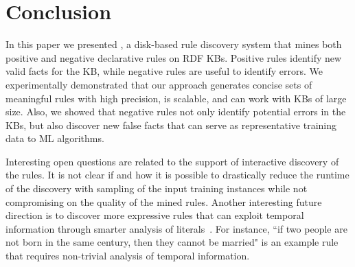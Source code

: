 \section{Conclusion}

In this paper we presented \krd, a disk-based rule discovery system that mines both positive and negative declarative rules on RDF KBs. Positive rules identify new valid facts for the KB, while negative rules are useful to identify errors. 
We experimentally demonstrated that our approach generates concise sets of meaningful rules with high precision,
is scalable, and can work with KBs of large size. 
Also, we showed that negative rules not only identify potential errors in the KBs, but also discover new false facts that can serve as representative training data to ML algorithms.

Interesting open questions are related to the support of interactive discovery of the rules. It is not clear if and how it is possible to drastically reduce the runtime of the discovery with sampling of the input training instances while not compromising on the quality of the mined rules. 
Another interesting future direction is to discover more expressive rules that can exploit temporal information through smarter analysis of literals~\cite{abedjan2015temporal}. For instance, ``if two people are not born in the same century, then they cannot be married" is an example rule that requires non-trivial analysis of temporal information. 


